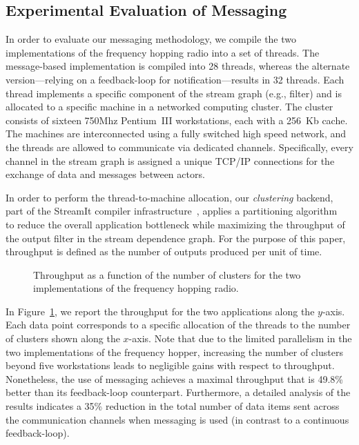 \subsection{Experimental Evaluation of Messaging}

In order to evaluate our messaging methodology, we compile the two
implementations of the frequency hopping radio into a set of
threads. The message-based implementation is compiled into 28 threads,
whereas the alternate version---relying on a feedback-loop for
notification---results in 32 threads.  Each thread implements a
specific component of the stream graph (e.g., filter) and is allocated
to a specific machine in a networked computing cluster.  The cluster
consists of sixteen 750Mhz Pentium~III workstations, each with a
256~Kb cache.  The machines are interconnected using a fully switched
high speed network, and the threads are allowed to communicate via
dedicated channels. Specifically, every channel in the stream graph is
assigned a unique TCP/IP connections for the exchange of data and
messages between actors.

In order to perform the thread-to-machine allocation, our {\it
clustering} backend, part of the StreamIt
compiler infrastructure~\cite{streamit-asplos}, applies a partitioning
algorithm~\cite{thies-msp} to reduce the overall application
bottleneck while maximizing the throughput of the output filter in the
stream dependence graph. For the purpose of this paper, throughput is
defined as the number of outputs produced per unit of time.

\begin{figure}[t]
\caption{\small Throughput as a function of the number of clusters for
the two implementations of the frequency hopping radio.
\protect\label{fig:fhr-throughput}}
\end{figure}

In Figure~\ref{fig:fhr-throughput}, we report the throughput for the
two applications along the $y$-axis.  Each data point corresponds to a
specific allocation of the threads to the number of clusters shown
along the $x$-axis.  Note that due to the limited parallelism in the
two implementations of the frequency hopper, increasing the number of
clusters beyond five workstations leads to negligible gains with
respect to throughput.  Nonetheless, the use of messaging achieves a
maximal throughput that is 49.8\% better than its feedback-loop
counterpart. Furthermore, a detailed analysis of the results indicates
a 35\% reduction in the total number of data items sent across the
communication channels when messaging is used (in contrast to a
continuous feedback-loop).

